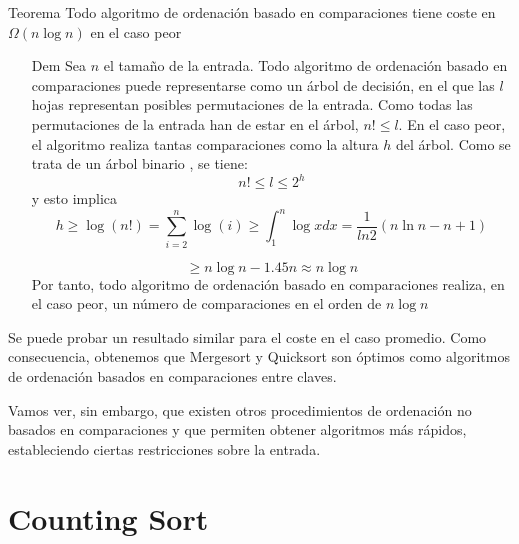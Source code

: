 \documentclass{beamer}
\begin{document}
\begin{frame}
\begin{block}{Teorema}
	Todo algoritmo de ordenación basado en comparaciones tiene coste en $\Omega(n\log n)$ en el caso peor
\end{block}

\begin{itemize}
	\item[Dem] Sea $n$ el tamaño de la entrada. Todo algoritmo de ordenación basado en comparaciones puede representarse como un árbol de decisión, en el que las $l$ hojas representan posibles permutaciones de la entrada. Como todas las permutaciones de la entrada han de estar en el árbol, $n! \leq l$. En el caso peor, el algoritmo realiza tantas comparaciones como la altura $h$ del árbol. Como se trata de un árbol binario , se tiene:
	$$n!\leq l\leq 2^h$$
	y esto implica
	$$h \geq \log(n!)= \sum_{i=2}^n\log(i) \geq\int_1^n \log x dx = \frac1{ln2}(n\ln n-n+1)$$
\end{itemize}
\end{frame}

\begin{frame}
\begin{itemize}
\item[]$$\geq n \log n-1.45n\approx n\log n$$
Por tanto, todo algoritmo de ordenación basado en comparaciones realiza, en el caso peor, un número de comparaciones en el orden de $n\log n$
\end{itemize}
\vspace{1cm}
Se puede probar un resultado similar para el coste en el caso promedio. Como consecuencia, obtenemos que Mergesort y Quicksort son óptimos como algoritmos de ordenación basados en comparaciones entre claves. 

Vamos  ver, sin embargo, que existen otros procedimientos de ordenación no basados en comparaciones y que permiten obtener algoritmos más rápidos, estableciendo ciertas restricciones sobre la entrada.
\end{frame}



\section{Counting Sort}
\end{document}
